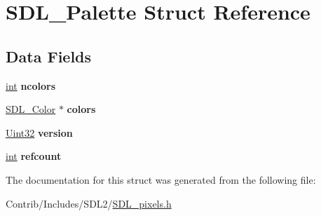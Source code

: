 \hypertarget{struct_s_d_l___palette}{}\section{S\+D\+L\+\_\+\+Palette Struct Reference}
\label{struct_s_d_l___palette}
\subsection*{Data Fields}
\begin{DoxyCompactItemize}
\item 
\hyperlink{_s_d_l__thread_8h_a6a64f9be4433e4de6e2f2f548cf3c08e}{int} {\bfseries ncolors}\hypertarget{struct_s_d_l___palette_aeac67cf686cea9cb1d69661714767244}{}\label{struct_s_d_l___palette_aeac67cf686cea9cb1d69661714767244}

\item 
\hyperlink{struct_s_d_l___color}{S\+D\+L\+\_\+\+Color} $\ast$ {\bfseries colors}\hypertarget{struct_s_d_l___palette_a6ffa1034612a7b59bb47a4614993829f}{}\label{struct_s_d_l___palette_a6ffa1034612a7b59bb47a4614993829f}

\item 
\hyperlink{_s_d_l__stdinc_8h_add440eff171ea5f55cb00c4a9ab8672d}{Uint32} {\bfseries version}\hypertarget{struct_s_d_l___palette_a5d07ecb490ddbe3cdc17e84185b7aeb1}{}\label{struct_s_d_l___palette_a5d07ecb490ddbe3cdc17e84185b7aeb1}

\item 
\hyperlink{_s_d_l__thread_8h_a6a64f9be4433e4de6e2f2f548cf3c08e}{int} {\bfseries refcount}\hypertarget{struct_s_d_l___palette_a6022c8a609170c7365fb96e83cb2df48}{}\label{struct_s_d_l___palette_a6022c8a609170c7365fb96e83cb2df48}

\end{DoxyCompactItemize}


The documentation for this struct was generated from the following file\+:\begin{DoxyCompactItemize}
\item 
Contrib/\+Includes/\+S\+D\+L2/\hyperlink{_s_d_l__pixels_8h}{S\+D\+L\+\_\+pixels.\+h}\end{DoxyCompactItemize}
